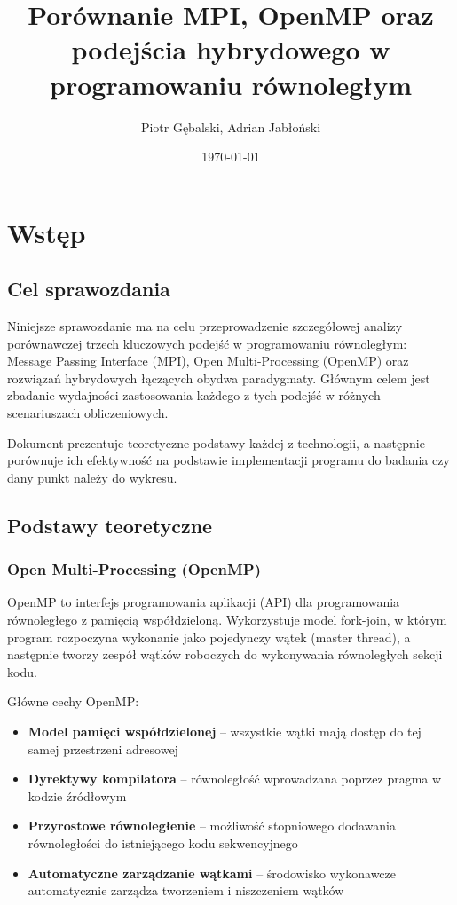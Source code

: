 \documentclass[12pt,a4paper]{report}
\title{Porównanie MPI, OpenMP oraz podejścia hybrydowego w programowaniu równoległym}
\author{Piotr Gębalski, Adrian Jabłoński}
\date{\today}
\begin{document}
\maketitle
\thispagestyle{empty}

\tableofcontents
\newpage

\chapter{Wstęp}

\section{Cel sprawozdania}

Niniejsze sprawozdanie ma na celu przeprowadzenie szczegółowej analizy porównawczej trzech kluczowych podejść w programowaniu równoległym: Message Passing Interface (MPI), Open Multi-Processing (OpenMP) oraz rozwiązań hybrydowych łączących obydwa paradygmaty. Głównym celem jest zbadanie wydajności zastosowania każdego z tych podejść w różnych scenariuszach obliczeniowych.

Dokument prezentuje teoretyczne podstawy każdej z technologii, a następnie porównuje ich efektywność na podstawie implementacji programu do badania czy dany punkt należy do wykresu.

\section{Podstawy teoretyczne}

\subsection{Open Multi-Processing (OpenMP)}

OpenMP to interfejs programowania aplikacji (API) dla programowania równoległego z pamięcią współdzieloną. Wykorzystuje model fork-join, w którym program rozpoczyna wykonanie jako pojedynczy wątek (master thread), a następnie tworzy zespół wątków roboczych do wykonywania równoległych sekcji kodu.

Główne cechy OpenMP:
\begin{itemize}
    \item \textbf{Model pamięci współdzielonej} -- wszystkie wątki mają dostęp do tej samej przestrzeni adresowej
    \item \textbf{Dyrektywy kompilatora} -- równoległość wprowadzana poprzez pragma w kodzie źródłowym
    \item \textbf{Przyrostowe równoległenie} -- możliwość stopniowego dodawania równoległości do istniejącego kodu sekwencyjnego
    \item \textbf{Automatyczne zarządzanie wątkami} -- środowisko wykonawcze automatycznie zarządza tworzeniem i niszczeniem wątków
\end{itemize}
\end{document}
